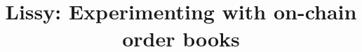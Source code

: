 \documentclass[envcountsect]{llncs}
\begin{document}
\frontmatter
\mainmatter

\title{\Large \bf Lissy: Experimenting with on-chain order books}





\maketitle
















\appendix

\end{document}
